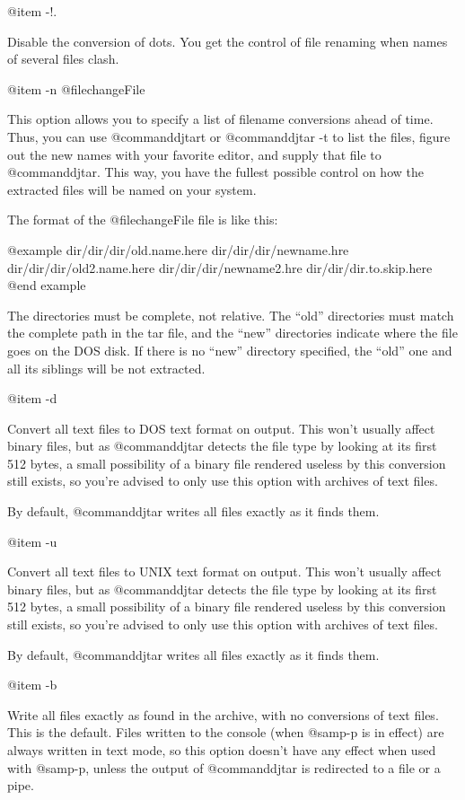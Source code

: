 @item -!.

Disable the conversion of dots.  You get the control of file renaming when
names of several files clash.

@item -n @file{changeFile}

This option allows you to specify a list of filename conversions ahead of
time.  Thus, you can use @command{djtart} or @command{djtar -t} to list the
files, figure out the new names with your favorite editor, and supply that
file to @command{djtar}.  This way, you have the fullest possible control on
how the extracted files will be named on your system.

The format of the @file{changeFile} file is like this:

@example
dir/dir/dir/old.name.here  dir/dir/dir/newname.hre
dir/dir/dir/old2.name.here  dir/dir/dir/newname2.hre
dir/dir/dir.to.skip.here
@end example

The directories must be complete, not relative.  The ``old'' directories
must match the complete path in the tar file, and the ``new'' directories
indicate where the file goes on the DOS disk.  If there is no ``new'' directory
specified, the ``old'' one and all its siblings will be not extracted.

@item -d

Convert all text files to DOS text format on output.  This won't usually
affect binary files, but as @command{djtar} detects the file type by looking
at its first 512 bytes, a small possibility of a binary file rendered
useless by this conversion still exists, so you're advised to only use
this option with archives of text files.

By default, @command{djtar} writes all files exactly as it finds them.

@item -u

Convert all text files to UNIX text format on output.  This won't usually
affect binary files, but as @command{djtar} detects the file type by looking
at its first 512 bytes, a small possibility of a binary file rendered
useless by this conversion still exists, so you're advised to only use
this option with archives of text files.

By default, @command{djtar} writes all files exactly as it finds them.

@item -b

Write all files exactly as found in the archive, with no conversions of
text files.  This is the default.
Files written to the console (when @samp{-p} is in effect) are always
written in text mode, so this option doesn't have any effect when used
with @samp{-p}, unless the output of @command{djtar} is redirected to a file
or a pipe.

